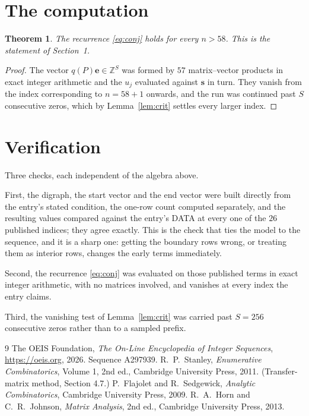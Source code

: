\documentclass[11pt,a4paper]{article}
\theoremstyle{plain}
\newtheorem{theorem}{Theorem}
\theoremstyle{definition}
\begin{document}
\section{The computation}

\begin{theorem}
The recurrence \eqref{eq:conj} holds for every $n>58$. This is the statement of
Section~1.
\end{theorem}

\begin{proof}
The vector $q(P)\mathbf{e}\in\mathbb{Z}^{S}$ was formed by $57$ matrix--vector
products in exact integer arithmetic and the $u_j$ evaluated against $\mathbf{s}$ in turn.
They vanish from the index corresponding to $n=58+1$ onwards, and the run was continued
past $S$ consecutive zeros, which by Lemma~\ref{lem:crit} settles every larger index.
\end{proof}

\section{Verification}

Three checks, each independent of the algebra above.

First, the digraph, the start vector and the end vector were built directly from the
entry's stated condition, the one-row count computed separately, and the resulting values
compared against the entry's DATA at every one of the $26$ published indices; they
agree exactly. This is the check that ties the model to the sequence, and it is a sharp one:
getting the boundary rows wrong, or treating them as interior rows, changes the early terms
immediately.

Second, the recurrence \eqref{eq:conj} was evaluated on those published terms in exact
integer arithmetic, with no matrices involved, and vanishes at every index the entry claims.

Third, the vanishing test of Lemma~\ref{lem:crit} was carried past $S=256$ consecutive
zeros rather than to a sampled prefix.

\begin{thebibliography}{9}
 The OEIS Foundation, \emph{The On-Line Encyclopedia of Integer
Sequences}, \url{https://oeis.org}, 2026. Sequence A297939.
 R.~P.~Stanley, \emph{Enumerative Combinatorics}, Volume 1, 2nd ed.,
Cambridge University Press, 2011. (Transfer-matrix method, Section 4.7.)
 P.~Flajolet and R.~Sedgewick, \emph{Analytic Combinatorics}, Cambridge
University Press, 2009.
 R.~A.~Horn and C.~R.~Johnson, \emph{Matrix Analysis}, 2nd ed., Cambridge
University Press, 2013.
\end{thebibliography}
\end{document}

